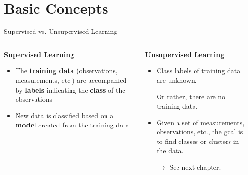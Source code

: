 \section{Basic Concepts}

\begin{frame}{Supervised vs. Unsupervised Learning}
	\begin{columns}
		\begin{column}{0.45\textwidth}
			\textbf{Supervised Learning}
			\begin{itemize}
				\item The \textbf{training data} (observations, measurements, etc.) are accompanied by \textbf{labels} indicating the \textbf{class} of the observations.
				\item New data is classified based on a \textbf{model} created from the training data.
			\end{itemize}

		\end{column}

		\begin{column}{0.45\textwidth}
			\textbf{Unsupervised Learning}

			\begin{itemize}
				\item Class labels of training data are unknown.

				      Or rather, there are no training data.
			\end{itemize}
			\begin{itemize}
				\item Given a set of measurements, observations, etc., the goal is to find classes or clusters in the data.

				      $\rightarrow$ See next chapter.
			\end{itemize}

		\end{column}
	\end{columns}
\end{frame}

